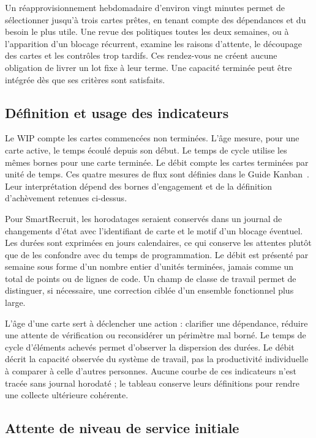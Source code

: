 Un réapprovisionnement hebdomadaire d'environ vingt minutes permet de sélectionner jusqu'à trois cartes prêtes, en tenant compte des dépendances et du besoin le plus utile. Une revue des politiques toutes les deux semaines, ou à l'apparition d'un blocage récurrent, examine les raisons d'attente, le découpage des cartes et les contrôles trop tardifs. Ces rendez-vous ne créent aucune obligation de livrer un lot fixe à leur terme. Une capacité terminée peut être intégrée dès que ses critères sont satisfaits.

\subsection{Définition et usage des indicateurs}

Le WIP compte les cartes commencées non terminées. L'âge mesure, pour une carte active, le temps écoulé depuis son début. Le temps de cycle utilise les mêmes bornes pour une carte terminée. Le débit compte les cartes terminées par unité de temps. Ces quatre mesures de flux sont définies dans le Guide Kanban~\cite{kanban-guide2025}. Leur interprétation dépend des bornes d'engagement et de la définition d'achèvement retenues ci-dessus.

Pour SmartRecruit, les horodatages seraient conservés dans un journal de changements d'état avec l'identifiant de carte et le motif d'un blocage éventuel. Les durées sont exprimées en jours calendaires, ce qui conserve les attentes plutôt que de les confondre avec du temps de programmation. Le débit est présenté par semaine sous forme d'un nombre entier d'unités terminées, jamais comme un total de points ou de lignes de code. Un champ de classe de travail permet de distinguer, si nécessaire, une correction ciblée d'un ensemble fonctionnel plus large.

L'âge d'une carte sert à déclencher une action : clarifier une dépendance, réduire une attente de vérification ou reconsidérer un périmètre mal borné. Le temps de cycle d'éléments achevés permet d'observer la dispersion des durées. Le débit décrit la capacité observée du système de travail, pas la productivité individuelle à comparer à celle d'autres personnes. Aucune courbe de ces indicateurs n'est tracée sans journal horodaté ; le tableau conserve leurs définitions pour rendre une collecte ultérieure cohérente.

\subsection{Attente de niveau de service initiale}

